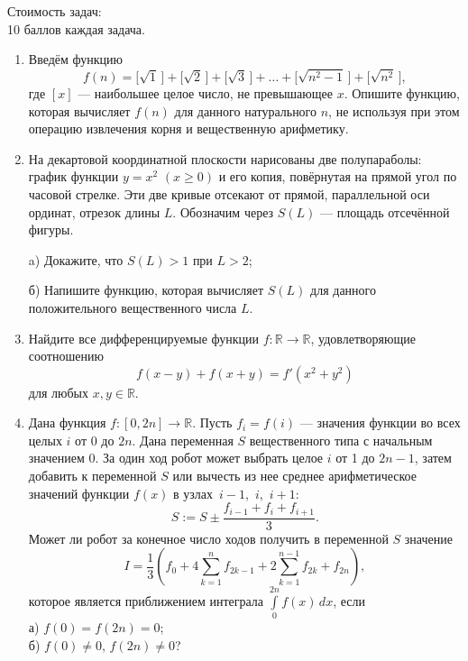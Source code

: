 \begin{flushright}
Стоимость задач: \\
10 баллов каждая задача.\\
\end{flushright}

\begin{enumerate}
\item Введём функцию
$$
f(n) = \bigl[\sqrt 1\,\bigr] + \bigl[\sqrt 2\,\bigr] + \bigl[\sqrt 3\,\bigr] + \hdots + \bigl[\sqrt{n^2-1}\,\bigr] + \bigl[\sqrt{n^2}\,\bigr],
$$
где $[x]$ --- наибольшее целое число, не превышающее $x$. Опишите функцию, которая вычисляет $f(n)$ для данного натурального $n$, не используя при этом операцию извлечения корня и вещественную арифметику.

\item На декартовой координатной плоскости нарисованы две полупараболы: график функции $y = x^2$ $(x \geqslant 0)$ и его копия, повёрнутая на прямой угол по часовой стрелке. Эти две кривые отсекают от прямой, параллельной оси ординат, отрезок длины $L$. Обозначим через $S(L)$ --- площадь отсечённой фигуры.

a) Докажите, что $S(L) > 1$ при $L > 2$;

б) Напишите функцию, которая вычисляет $S(L)$ для данного положительного вещественного числа $L$.



\item Найдите все дифференцируемые функции $f\colon \mathbb R\rightarrow\mathbb R$, удовлетворяющие соотношению
$$
f(x-y) + f(x+y) = f'(x^2 + y^2)
$$
для любых $x,y\in\mathbb R$.



\item  Дана функция $f\colon [0, 2n]\rightarrow\mathbb R$. Пусть $f_i = f(i)$ --- значения функции во всех целых $i$ от 0 до $2n$. Дана переменная $S$ вещественного типа с начальным значением 0. За один ход робот может выбрать целое $i$ от 1 до $2n-1$, затем добавить к переменной $S$ или вычесть из нее среднее арифметическое значений функции $f(x)$ в узлах~$i-1$,~$i$,~$i+1$:
$$S := S \pm \frac{f_{i-1}+f_i+f_{i+1}}{3}.$$ 
Может ли робот за конечное число ходов получить в переменной $S$ значение
$$I = \frac{1}{3} \left(f_0 + 4\sum\limits_{k=1}^{n}{f_{2k-1}} + 2\sum\limits_{k=1}^{n-1}{f_{2k}} + f_{2n}\right),$$
которое является приближением интеграла $\displaystyle \int\limits_0^{2n} f(x)\,dx$, если\\
а) $f(0) = f(2n) = 0$;\\
б) $f(0) \ne 0$, $f(2n) \ne 0$?


\end{enumerate}
